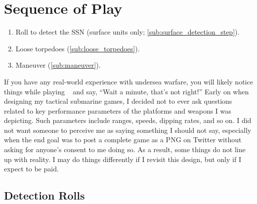 \documentclass[../TacSubMicroRules.tex]{subfiles}
\begin{document}
\section{Sequence of Play}%
\label{sec:sequence_of_play}

\begin{enumerate}
    \item Roll to detect the SSN (surface units only; \ref{sub:surface_detection_step}).
    \item Loose torpedoes (\ref{sub:loose_torpedoes}).
    \item Maneuver (\ref{sub:maneuver}).
\end{enumerate}

\begin{design}
    If you have any real-world experience with undersea warfare, you will likely notice things while playing \gametitle~ and say, ``Wait a minute, that's not right!''
    Early on when designing my tactical submarine games, I decided not to ever ask questions related to key performance parameters of the platforms and weapons I was depicting.
    Such parameters include ranges, speeds, dipping rates, and so on.
    I did not want someone to perceive me as saying something I should not say, especially when the end goal was to post a complete game as a PNG on Twitter without asking for anyone's consent to me doing so.
    As a result, some things do not line up with reality.
    I may do things differently if I revisit this design, but only if I expect to be paid.
\end{design}

\subsection{Detection Rolls}%
\label{sub:detection_rolls}

\end{document}

